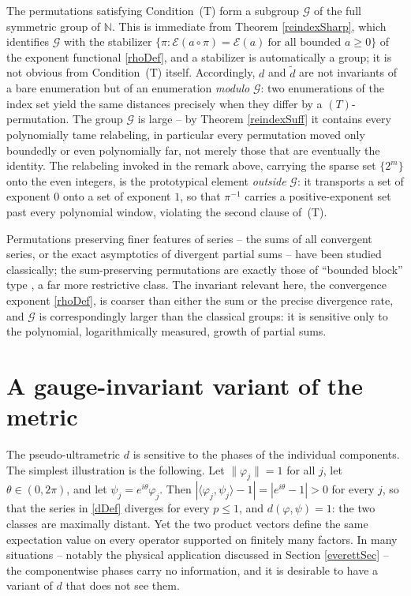 \documentclass[twoside,11pt,letter]{article}
\def\bN{\mathbb{N}}
\newcommand{\cexp}{\mathcal{E}}  %
\theoremstyle{definition}
\theoremstyle{definition}
\theoremstyle{plain}
\newenvironment{remark}[1][Remark.]{\begin{trivlist}
\item[\hskip \labelsep {\bfseries #1}]}{\end{trivlist}}
\begin{document}
\begin{remark}
The permutations satisfying Condition~(T) form a subgroup $\mathcal G$ of the full symmetric group of $\bN$. This is immediate from Theorem \ref{reindexSharp}, which identifies $\mathcal G$ with the stabilizer $\{\pi:\cexp(a\circ\pi)=\cexp(a)\ \text{for all bounded }a\geq0\}$ of the exponent functional \eqref{rhoDef}, and a stabilizer is automatically a group; it is not obvious from Condition~(T) itself. Accordingly, $d$ and $\tilde d$ are not invariants of a bare enumeration but of an enumeration \emph{modulo} $\mathcal G$: two enumerations of the index set yield the same distances precisely when they differ by a $(T)$-permutation. The group $\mathcal G$ is large -- by Theorem \ref{reindexSuff} it contains every polynomially tame relabeling, in particular every permutation moved only boundedly or even polynomially far, not merely those that are eventually the identity. The relabeling invoked in the remark above, carrying the sparse set $\{2^m\}$ onto the even integers, is the prototypical element \emph{outside} $\mathcal G$: it transports a set of exponent $0$ onto a set of exponent $1$, so that $\pi^{-1}$ carries a positive-exponent set past every polynomial window, violating the second clause of~(T).
\end{remark}

\begin{remark}
Permutations preserving finer features of series -- the sums of all convergent series, or the exact asymptotics of divergent partial sums -- have been studied classically; the sum-preserving permutations are exactly those of ``bounded block'' type \cite{L46,A55,P77}, a far more restrictive class. The invariant relevant here, the convergence exponent \eqref{rhoDef}, is coarser than either the sum or the precise divergence rate, and $\mathcal G$ is correspondingly larger than the classical groups: it is sensitive only to the polynomial, logarithmically measured, growth of partial sums.
\end{remark}

\section{\label{weakSec}A gauge-invariant variant of the metric}

The pseudo-ultrametric $d$ is sensitive to the phases of the individual components. The simplest illustration is the following. Let $\|\varphi_j\|=1$ for all $j$, let $\theta\in(0,2\pi)$, and let $\psi_j=e^{i\theta}\varphi_j$. Then $|\langle\varphi_j,\psi_j\rangle-1|=|e^{i\theta}-1|>0$ for every $j$, so that the series in \eqref{dDef} diverges for every $p\leq1$, and $d(\varphi,\psi)=1$: the two classes are maximally distant. Yet the two product vectors define the same expectation value on every operator supported on finitely many factors. In many situations -- notably the physical application discussed in Section \ref{everettSec} -- the componentwise phases carry no information, and it is desirable to have a variant of $d$ that does not see them.
\end{document}
